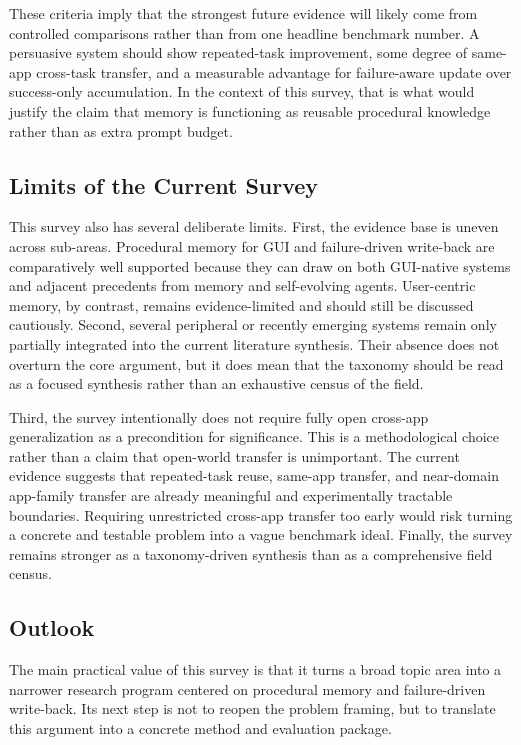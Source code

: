 \documentclass{article}
\begin{document}
These criteria imply that the strongest future evidence will likely come
from controlled comparisons rather than from one headline benchmark
number. A persuasive system should show repeated-task improvement, some
degree of same-app cross-task transfer, and a measurable advantage for
failure-aware update over success-only accumulation. In the context of
this survey, that is what would justify the claim that memory is
functioning as reusable procedural knowledge rather than as extra prompt
budget.

\subsection{Limits of the Current
Survey}\label{92-limits-of-the-current-survey}

This survey also has several deliberate limits. First, the evidence base
is uneven across sub-areas. Procedural memory for GUI and failure-driven
write-back are comparatively well supported because they can draw on
both GUI-native systems and adjacent precedents from memory and
self-evolving agents. User-centric memory, by contrast, remains
evidence-limited and should still be discussed cautiously. Second,
several peripheral or recently emerging systems remain only partially
integrated into the current literature synthesis. Their absence does not
overturn the core argument, but it does mean that the taxonomy should be
read as a focused synthesis rather than an exhaustive census of the
field.

Third, the survey intentionally does not require fully open cross-app
generalization as a precondition for significance. This is a
methodological choice rather than a claim that open-world transfer is
unimportant. The current evidence suggests that repeated-task reuse,
same-app transfer, and near-domain app-family transfer are already
meaningful and experimentally tractable boundaries. Requiring
unrestricted cross-app transfer too early would risk turning a concrete
and testable problem into a vague benchmark ideal. Finally, the survey
remains stronger as a taxonomy-driven synthesis than as a comprehensive
field census.

\subsection{Outlook}\label{93-outlook}

The main practical value of this survey is that it turns a broad topic
area into a narrower research program centered on procedural memory and
failure-driven write-back. Its next step is not to reopen the problem
framing, but to translate this argument into a concrete method and
evaluation package.
\end{document}
